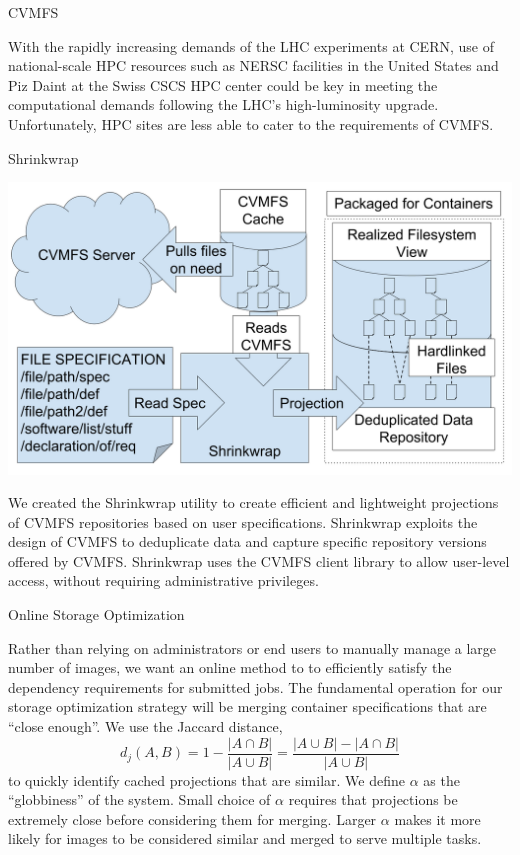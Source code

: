 \documentclass{beamer}
\newcommand{\SHR}{Shrinkwrap\xspace}
\newenvironment{BlueBlock}[1]
{\begin{alertblock}{#1\rule{0pt}{2.3ex}} \vspace*{16pt}}
{\end{alertblock}}
\begin{document}
\begin{frame}[fragile]
\begin{minipage}[t][0.93\textheight]{0.32\textwidth}
\begin{BlueBlock}{CVMFS}
{With the rapidly increasing demands of the LHC experiments at CERN,
use of national-scale HPC resources such as NERSC facilities in the United States and Piz Daint at the Swiss CSCS HPC center could be key in meeting the computational demands following the LHC's high-luminosity upgrade.
Unfortunately, HPC sites are less able to cater to the requirements of CVMFS.
}
\end{BlueBlock}

\vfill

\begin{BlueBlock}{Shrinkwrap}
\centering
\includegraphics[width=0.8\linewidth]{drawings/shrinkwrap-structure.png}

\parbox{\linewidth}{
We created the \SHR utility to
create efficient and lightweight projections of CVMFS repositories
based on user specifications.
\SHR exploits the design of CVMFS to deduplicate
data and capture specific repository versions offered by CVMFS.
\SHR uses the CVMFS client library
to allow user-level access,
without requiring administrative privileges.
}
\end{BlueBlock}


\end{minipage}\hfill
\begin{minipage}[t][0.93\textheight]{0.32\textwidth}

\begin{BlueBlock}{Online Storage Optimization}
\parbox{\linewidth}{
Rather than relying on administrators or end users to manually manage a large number of images,
we want an online method to to efficiently satisfy the dependency requirements for submitted jobs.
The fundamental operation for our storage optimization strategy will be merging container specifications that are ``close enough''.
We use the Jaccard distance,
\[
d_j(A, B) = 1 - \frac{|A \cap B|}{|A \cup B|} = \frac{|A \cup B| - |A \cap B|}{|A \cup B|}
\]
to quickly identify cached projections that are similar.
We define $\alpha$ as the ``globbiness'' of the system.
Small choice of $\alpha$ requires that projections be extremely close before considering them for merging.
Larger $\alpha$ makes it more likely for images to be considered similar and merged
to serve multiple tasks.
}
\end{BlueBlock}


\end{minipage}
\end{frame}
\end{document}
